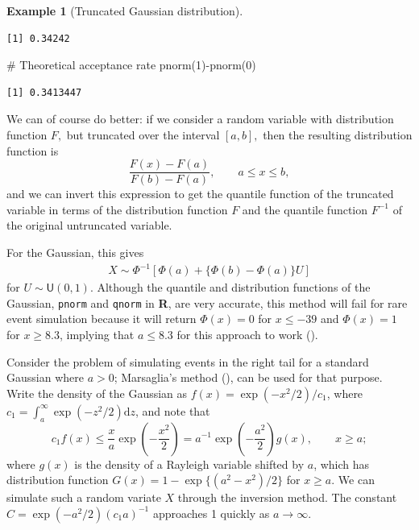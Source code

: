 \documentclass[
  11pt,
  letterpaper,
]{scrbook}
\newenvironment{Shaded}{\begin{snugshade}}{\end{snugshade}}
\newcommand{\CommentTok}[1]{\textcolor[rgb]{0.37,0.37,0.37}{#1}}
\newcommand{\DecValTok}[1]{\textcolor[rgb]{0.68,0.00,0.00}{#1}}
\newcommand{\FunctionTok}[1]{\textcolor[rgb]{0.28,0.35,0.67}{#1}}
\newcommand{\NormalTok}[1]{\textcolor[rgb]{0.00,0.23,0.31}{#1}}
\newcommand{\SpecialCharTok}[1]{\textcolor[rgb]{0.37,0.37,0.37}{#1}}
\theoremstyle{definition}
\theoremstyle{plain}
\theoremstyle{plain}
\theoremstyle{definition}
\newtheorem{example}{Example}[chapter]
\theoremstyle{definition}
\theoremstyle{remark}
\begin{document}
\begin{example}[Truncated Gaussian
distribution]
\begin{verbatim}
[1] 0.34242
\end{verbatim}

\begin{Shaded}
\begin{Highlighting}[]
\CommentTok{\# Theoretical acceptance rate}
\FunctionTok{pnorm}\NormalTok{(}\DecValTok{1}\NormalTok{)}\SpecialCharTok{{-}}\FunctionTok{pnorm}\NormalTok{(}\DecValTok{0}\NormalTok{)}
\end{Highlighting}
\end{Shaded}

\begin{verbatim}
[1] 0.3413447
\end{verbatim}

We can of course do better: if we consider a random variable with
distribution function \(F,\) but truncated over the interval \([a,b],\)
then the resulting distribution function is
\[\frac{F(x) - F(a)}{F(b)-F(a)}, \qquad a \leq x \leq b,\] and we can
invert this expression to get the quantile function of the truncated
variable in terms of the distribution function \(F\) and the quantile
function \(F^{-1}\) of the original untruncated variable.

For the Gaussian, this gives \begin{align*}
X \sim \Phi^{-1}\left[\Phi(a) + \{\Phi(b)-\Phi(a)\}U\right]
\end{align*} for \(U \sim \mathsf{U}(0,1)\). Although the quantile and
distribution functions of the Gaussian, \texttt{pnorm} and
\texttt{qnorm} in \textbf{R}, are very accurate, this method will fail
for rare event simulation because it will return \(\Phi(x) = 0\) for
\(x \leq -39\) and \(\Phi(x)=1\) for \(x \geq 8.3\), implying that
\(a \leq 8.3\) for this approach to work
().

Consider the problem of simulating events in the right tail for a
standard Gaussian where \(a > 0\); Marsaglia's method
(), can be used for that
purpose. Write the density of the Gaussian as
\(f(x) = \exp(-x^2/2)/c_1\), where
\(c_1 = \int_{a}^{\infty}\exp(-z^2/2)\mathrm{d} z\), and note that
\[c_1f(x) \leq \frac{x}{a}\exp\left(-\frac{x^2}{2}\right)= a^{-1}\exp\left(-\frac{a^2}{2}\right)g(x), \qquad x \geq a;\]
where \(g(x)\) is the density of a Rayleigh variable shifted by \(a\),
which has distribution function \(G(x) = 1-\exp\{(a^2-x^2)/2\}\) for
\(x \geq a\). We can simulate such a random variate \(X\) through the
inversion method. The constant \(C= \exp(-a^2/2)(c_1a)^{-1}\) approaches
1 quickly as \(a \to \infty\).


\end{example}
\end{document}
